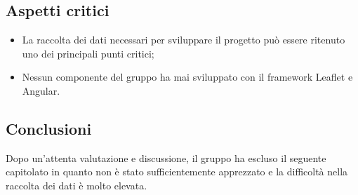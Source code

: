\subsection{Aspetti critici}
\begin{itemize}
	\item La raccolta dei dati necessari per sviluppare il progetto può essere ritenuto uno dei principali punti critici;
	\item Nessun componente del gruppo ha mai sviluppato con il framework Leaflet e Angular.
\end{itemize}

\subsection{Conclusioni}
Dopo un'attenta valutazione e discussione, il gruppo ha escluso il seguente capitolato in quanto non è stato sufficientemente apprezzato e la difficoltà nella raccolta dei dati è molto elevata.